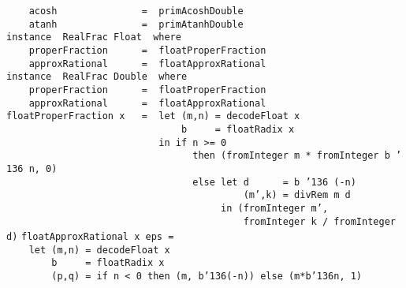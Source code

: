 \mbox{\tt \ \ \ \ acosh\ \ \ \ \ \ \ \ \ \ \ \ \ \ \ =\ \ primAcoshDouble}\\
\mbox{\tt \ \ \ \ atanh\ \ \ \ \ \ \ \ \ \ \ \ \ \ \ =\ \ primAtanhDouble}
%
\eprogB\noindent\bprogB
\mbox{\tt instance\ \ RealFrac\ Float\ \ where}\\
\mbox{\tt \ \ \ \ properFraction\ \ \ \ \ \ =\ \ floatProperFraction}\\
\mbox{\tt \ \ \ \ approxRational\ \ \ \ \ \ =\ \ floatApproxRational}
%
\eprogB\noindent\bprogB
\mbox{\tt instance\ \ RealFrac\ Double\ \ where}\\
\mbox{\tt \ \ \ \ properFraction\ \ \ \ \ \ =\ \ floatProperFraction}\\
\mbox{\tt \ \ \ \ approxRational\ \ \ \ \ \ =\ \ floatApproxRational}
%
\eprogB\noindent\bprogB
\mbox{\tt floatProperFraction\ x\ \ \ =\ \ let\ (m,n)\ =\ decodeFloat\ x}\\
\mbox{\tt \ \ \ \ \ \ \ \ \ \ \ \ \ \ \ \ \ \ \ \ \ \ \ \ \ \ \ \ \ \ \ b\ \ \ \ \ =\ floatRadix\ x}\\
\mbox{\tt \ \ \ \ \ \ \ \ \ \ \ \ \ \ \ \ \ \ \ \ \ \ \ \ \ \ \ in\ if\ n\ >=\ 0}\\
\mbox{\tt \ \ \ \ \ \ \ \ \ \ \ \ \ \ \ \ \ \ \ \ \ \ \ \ \ \ \ \ \ \ \ \ \ then\ (fromInteger\ m\ *\ fromInteger\ b\ {\char'136}\ n,\ 0)}\\
\mbox{\tt \ \ \ \ \ \ \ \ \ \ \ \ \ \ \ \ \ \ \ \ \ \ \ \ \ \ \ \ \ \ \ \ \ else\ let\ d\ \ \ \ \ \ =\ b\ {\char'136}\ (-n)}\\
\mbox{\tt \ \ \ \ \ \ \ \ \ \ \ \ \ \ \ \ \ \ \ \ \ \ \ \ \ \ \ \ \ \ \ \ \ \ \ \ \ \ \ \ \ \ (m',k)\ =\ divRem\ m\ d}\\
\mbox{\tt \ \ \ \ \ \ \ \ \ \ \ \ \ \ \ \ \ \ \ \ \ \ \ \ \ \ \ \ \ \ \ \ \ \ \ \ \ \ in\ (fromInteger\ m',}\\
\mbox{\tt \ \ \ \ \ \ \ \ \ \ \ \ \ \ \ \ \ \ \ \ \ \ \ \ \ \ \ \ \ \ \ \ \ \ \ \ \ \ \ \ \ \ fromInteger\ k\ /\ fromInteger\ d)}
\eprogB\noindent\bprogB
\mbox{\tt floatApproxRational\ x\ eps\ =}\\
\mbox{\tt \ \ \ \ let\ (m,n)\ =\ decodeFloat\ x}\\
\mbox{\tt \ \ \ \ \ \ \ \ b\ \ \ \ \ =\ floatRadix\ x}\\
\mbox{\tt \ \ \ \ \ \ \ \ (p,q)\ =\ if\ n\ <\ 0\ then\ (m,\ b{\char'136}(-n))\ else\ (m*b{\char'136}n,\ 1)}\\
